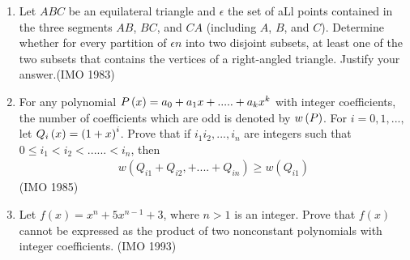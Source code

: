 \begin{enumerate}
	\item Let $ABC$ be an equilateral triangle and $\epsilon$ the set of aLl points contained in the three segments $AB$, $BC$, and $CA$ (including $A$, $B$, and $C$). Determine whether for every partition of $\epsilon n$ into two disjoint subsets, at least one of the two subsets that contains the vertices of a right-angled triangle. Justify your answer.\hfill(IMO 1983)

	\item For any polynomial $P\left(x\right) = a_0 + a_1x + ..... + a_kx^k$ with integer coefficients,  the number of coefficients which are odd is denoted by $w\left(P\right)$.  For $i = 0, 1, ..., $let $Q_i\left(x\right) = \left(1+x\right)^i$. Prove that if $i_1i_2, ..., i_n$ are integers such that  $0\leq i_1<i_2<......<i_n$, then \begin{align*}  w (Q_{i1}+Q_{i2},+....+Q_{in})\geq w (Q_{i1}) \end{align*}\hfill(IMO 1985)                                     
\item Let $f(x)=x^{n}+5x^{n-1}+3$, where $n>1$ is an integer. Prove that $f(x)$ cannot be expressed as the product of two nonconstant polynomials with integer coefficients.  \hfill(IMO 1993)
\end{enumerate}
